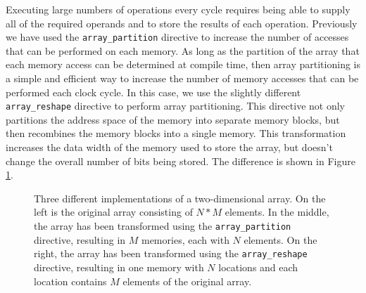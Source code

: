 Executing large numbers of operations every cycle requires being able to supply all of the required operands and to store the results of each operation.   Previously we have used the \lstinline{array_partition} directive to increase the number of accesses that can be performed on each memory.  As long as the partition of the array that each memory access can be determined at compile time, then array partitioning is a simple and efficient way to increase the number of memory accesses that can be performed each clock cycle.  In this case, we use the slightly different \lstinline{array_reshape} directive to perform array partitioning.  This directive not only partitions the address space of the memory into separate memory blocks, but then recombines the memory blocks into a single memory.  This transformation increases the data width of the memory used to store the array, but doesn't change the overall number of bits being stored.  The difference is shown in Figure \ref{fig:matmul_array_reshape}.

\begin{figure}
\centering

\caption{Three different implementations of a two-dimensional array.  On the left is the original array consisting of $N*M$ elements.  In the middle, the array has been transformed using the \lstinline{array_partition} directive, resulting in $M$ memories, each with $N$ elements.  On the right, the array has been transformed using the \lstinline{array_reshape} directive, resulting in one memory with $N$ locations and each location contains $M$ elements of the original array.}
\label{fig:matmul_array_reshape}
\end{figure}

